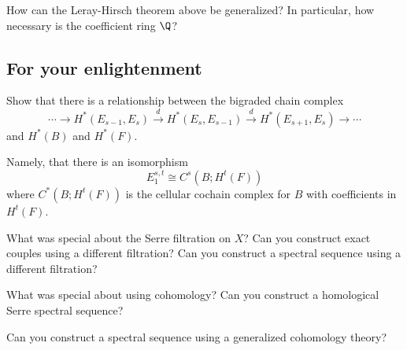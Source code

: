 \begin{xca}
	How can the Leray-Hirsch theorem above be generalized? In particular, how necessary is the coefficient ring $\Q$?
\end{xca}


\subsection{For your enlightenment}


\begin{xca}
	Show that there is a relationship between the bigraded chain complex $$\cdots \to H^*(E_{s-1},E_{s})\xrightarrow{d}  H^*(E_s,E_{s-1}) \xrightarrow{d} H^*(E_{s+1},E_{s}) \to \cdots $$
	and $H^*(B)$ and $H^*(F)$.
	
	Namely, that there is an isomorphism $$E_1^{s,t} \cong C^s(B;H^{t}(F))$$
	where $C^*(B;H^{t}(F))$ is the cellular cochain complex for $B$ with coefficients in $H^{t}(F)$.
\end{xca}


\begin{xca}
	What was special about the Serre filtration on $X$?  Can you construct exact couples using a different filtration?  Can you construct a spectral sequence using a different filtration?
\end{xca}

\begin{xca}
	What was special about using cohomology?  Can you construct a homological Serre spectral sequence?  
	
	Can you construct a spectral sequence using a generalized cohomology theory?
\end{xca}